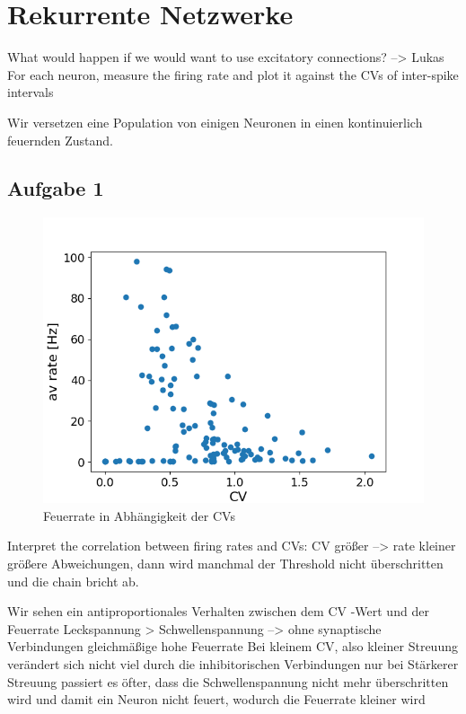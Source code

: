 \documentclass[10pt,a4paper]{scrartcl}
\begin{document}
\newpage


\section{Rekurrente Netzwerke}
What would happen if we would want to use excitatory connections? --> Lukas
For each neuron, measure the firing rate and plot it against the
CVs of inter-spike intervals

Wir versetzen eine Population von einigen Neuronen in einen kontinuierlich feuernden Zustand. 

\subsection{Aufgabe 1}
\begin{figure} [ht]
\begin{center}
\label{fig:abb4}
\caption{Feuerrate in Abhängigkeit der CVs}
\includegraphics[scale=0.45]{pictures/decorr_rate_over_cv.png}
\end{center}
\end{figure}

Interpret the correlation between firing rates and CVs:
CV größer --> rate kleiner
größere Abweichungen, dann wird manchmal der Threshold nicht überschritten und die chain bricht ab.

Wir sehen ein antiproportionales Verhalten zwischen dem CV -Wert und der Feuerrate
Leckspannung > Schwellenspannung --> ohne synaptische Verbindungen gleichmäßige hohe Feuerrate
Bei kleinem CV, also kleiner Streuung verändert sich nicht viel durch die inhibitorischen Verbindungen
nur bei Stärkerer Streuung passiert es öfter, dass die Schwellenspannung nicht mehr überschritten wird und damit ein Neuron nicht feuert, wodurch die Feuerrate kleiner wird
\end{document}
